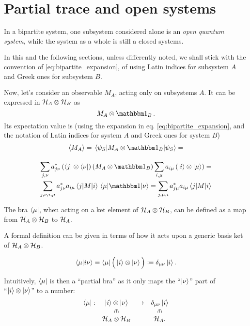 \section{Partial trace and open systems}
\label{sec:p_tr}

In a bipartite system, one subsystem considered alone is an
\emph{open quantum system},
while the system as a whole is still a closed systems.

In this and the following sections, unless differently noted,
we shall stick with the convention of \eqref{eq:bipartite_expansion},
of using
Latin indices for subsystem $A$ and Greek ones for subsystem $B$.

Now, let's consider an observable $M_A$, acting only on subsystems $A$.
It can be expressed in $\mathcal{H}_A \otimes \mathcal{H}_B$ as
\[
  M_A \otimes \idop_B\, .
\]
Its expectation value is
(using the expansion in eq. \eqref{eq:bipartite_expansion},
and the notation of Latin indices for system $A$ and Greek ones for system $B$)
\begin{multline}\label{eq:exp_subsys}
  \expval{M_A} = \matrixel{\psi_S}{M_A\otimes\idop_B}{\psi_S} = \\[1em]
  \sum_{j,\nu}a^{*}_{j\nu}\left(\bra{j}\otimes\bra{\nu}\right)\left(M_A\otimes\idop_B\right)\sum_{i,\mu}a_{i\mu}\left(\ket{i}\otimes\ket{\mu}\right) = \\
  \sum_{j,\nu,i,\mu}a^{*}_{j\nu}a_{i\mu}\matrixel{j}{M}{i}\matrixel{\mu}{\idop}{\nu} =
  \sum_{j,\mu,i}a^{*}_{j\mu}a_{i\mu}\matrixel{j}{M}{i}
\end{multline}

The bra $\bra{\mu}$, when acting on a ket element of $\mathcal{H}_{A} \otimes \mathcal{H}_{B}$,
can be defined
as a map from $\mathcal{H}_A\otimes\mathcal{H}_B$ to $\mathcal{H}_A$.

A formal definition can be given in terms of how it acts upon a generic
basis ket of $\mathcal{H}_A\otimes\mathcal{H}_B$.

\begin{definition}\label{def:pBra}
\[
  \braket{\mu}{i\nu} = \bra{\mu}\Big(\ket{i}\otimes\ket{\nu}\Big) \coloneqq \delta_{\mu\nu}\ket{i} \text{.}
\]
\end{definition}

Intuitively, $\bra{\mu}$ is then a ``partial bra''
as it only maps the ``$\ket{\nu}$'' part of\\
``$\ket{i}\otimes\ket{\nu}$''
to a number:
\[
  \begin{array}{cccc}
    \bra{\mu}:  & \ket{i}\ox\ket{\nu}                   & \rightarrow & \delta_{\mu\nu}\ket{i}                \\
                & \rotatebox[origin=c]{270}{$\in$}      &             & \rotatebox[origin=c]{270}{$\in$}      \\
                & \hilb{H}_A\ox\hilb{H}_B               &             & \hilb{H}_A   \text{.}
  \end{array}
\]

